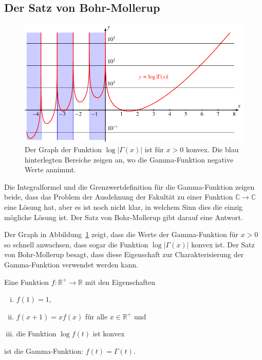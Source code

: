 %
%
%
\subsection{Der Satz von Bohr-Mollerup
\label{buch:rekursion:subsection:bohr-mollerup}}
\begin{figure}
\centering
\includegraphics{chapters/040-rekursion/images/loggammaplot.pdf}
\caption{Der Graph der Funktion $\log|\Gamma(x)|$ ist für $x>0$ konvex. 
Die blau hinterlegten Bereiche zeigen an, wo die Gamma-Funktion
negative Werte annimmt.
\label{buch:rekursion:gamma:loggammaplot}}
\end{figure}
Die Integralformel und die Grenzwertdefinition für die Gamma-Funktion
zeigen beide, dass das Problem der Ausdehnung der Fakultät zu einer
Funktion $\mathbb{C}\to\mathbb{C}$ eine Lösung hat, aber es ist noch
nicht klar, in welchem Sinn dies die einzig mögliche Lösung ist.
Der Satz von Bohr-Mollerup gibt darauf eine Antwort.

Der Graph in Abbildung~\ref{buch:rekursion:gamma:loggammaplot}
zeigt, dass die Werte der Gamma-Funktion für $x>0$ so schnell
anwachsen, dass sogar die Funktion $\log|\Gamma(x)|$ konvex ist.
Der Satz von Bohr-Mollerup besagt, dass diese Eigenschaft zur
Charakterisierung der Gamma-Funktion verwendet werden kann.

\begin{satz}
\label{buch:satz:bohr-mollerup}
Eine Funktion $f\colon \mathbb{R}^+\to\mathbb{R}$ mit den Eigenschaften
\begin{enumerate}[i)]
\item $f(1)=1$,
\item $f(x+1)=xf(x)$ für alle $x\in\mathbb{R}^+$ und
\item die Funktion $\log f(t)$ ist konvex
\end{enumerate}
ist die Gamma-Funktion: $f(t)=\Gamma(t)$.
%
%
\end{satz}


